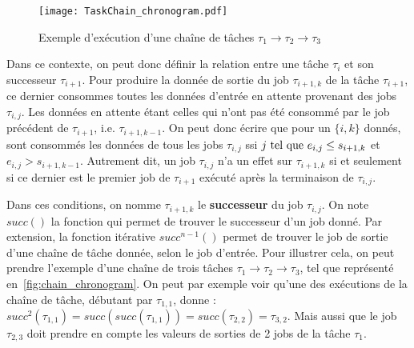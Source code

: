 \documentclass[french, a4paper, 11pt, twoside, pdftex]{StyleThese}
\begin{document}
	    \begin{figure}[ht]
	    	\centering
	    	\texttt{[image: TaskChain\_chronogram.pdf]}
	    	\caption{Exemple d'exécution d'une chaîne de tâches $\tau_1 \rightarrow \tau_2 \rightarrow \tau_3$}
	    	\label{fig:chain_chronogram}
	    \end{figure}
    
	    Dans ce contexte, on peut donc définir la relation entre une tâche $\tau_i$ et son successeur $\tau_{i+1}$. Pour produire la donnée de sortie du job $\tau_{i+1,k}$ de la tâche $\tau_{i+1}$, ce dernier consommes toutes les données d'entrée en attente provenant des jobs $\tau_{i,j}$. Les données en attente étant celles qui n'ont pas été consommé par le job précédent de $\tau_{i+1}$, i.e. $\tau_{i+1,k-1}$. On peut donc écrire que pour un $\{i,k\}$ donnés, sont consommés les données de tous les jobs $\tau_{i,j}$ ssi $j \textup{ tel que } e_{i,j} \leq s_{i+1, k}$ et $e_{i,j} > s_{i+1, k-1}$. Autrement dit, un job $\tau_{i,j}$ n'a un effet sur $\tau_{i+1,k}$ si et seulement si ce dernier est le premier job de $\tau_{i+1}$ exécuté après la terminaison de $\tau_{i,j}$.
	    
		Dans ces conditions, on nomme $\tau_{i+1,k}$ le \textbf{successeur} du job $\tau_{i,j}$. On note $succ()$ la fonction qui permet de trouver le successeur d'un job donné. Par extension, la fonction itérative $succ^{n-1}()$ permet de trouver le job de sortie d'une chaîne de tâche donnée, selon le job d'entrée. 
	    Pour illustrer cela, on peut prendre l'exemple d'une chaîne de trois tâches $\tau_1 \rightarrow \tau_2 \rightarrow \tau_3$, tel que représenté en~\autoref{fig:chain_chronogram}. On peut par exemple voir qu'une des exécutions de la chaîne de tâche, débutant par $\tau_{1,1}$, donne : $succ^{2}(\tau_{1,1}) = succ(succ(\tau_{1,1})) = succ(\tau_{2,2}) = \tau_{3,2}$. Mais aussi que le job $ \tau_{2,3} $ doit prendre en compte les valeurs de sorties de 2 jobs de la tâche $ \tau_1 $. %
	    
\end{document}
